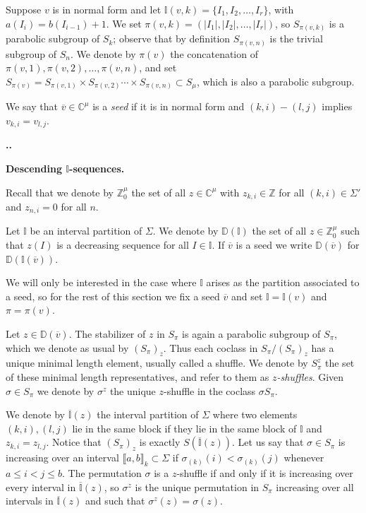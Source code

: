 \documentclass[11pt,fleqn]{amsart}
\renewcommand\thesection{\arabic{section}}
\newcounter{para}[section]
\renewcommand\thepara{\thesection.\arabic{para}}
\def\paragraph{%
 \noindent
 \refstepcounter{para}%
 \textbf{\thepara.}\hspace{1ex}%
}
\newcommand\about[1]{%
 {\bfseries#1.}%
}
\newcommand\CC{\mathbb C}
\newcommand\ZZ{\mathbb Z}
\newcommand\vv{\overline{v}}
\newcommand\II{\mathbb I}
\newcommand\RI{\overline{\mathbb I}}
\newcommand\interval[1]{\llbracket #1 \rrbracket}
\newcommand\abs[1]{|#1|}
\newcommand\DD{\mathbb D}
\begin{document}
Suppose $v$ is in normal form and let $\II(v,k) = \{I_1, I_2, \ldots, I_r\}$, 
with $a(I_i) = b(I_{i-1}) + 1$. We set $\pi(v,k) = (\abs{I_1},\abs{I_2}, 
\ldots, \abs{I_r})$, so $S_{\pi(v,k)}$ is a parabolic subgroup of $S_k$; 
observe that by definition $S_{\pi(v,n)}$ is the trivial subgroup of $S_n$. 
We denote by $\pi(v)$ the concatenation of $\pi(v,1), \pi(v,2), \ldots,
\pi(v,n)$, and set $S_{\pi(v)} = S_{\pi(v,1)} \times S_{\pi(v,2)} \cdots 
\times S_{\pi(v,n)} \subset S_\mu$, which is also a parabolic subgroup.
\begin{Definition}
We say that $\vv \in \CC^\mu$ is a \emph{seed} if it is in normal form and 
$(k,i) - (l,j)$ implies $v_{k,i} = v_{l,j}$.
\end{Definition}

\paragraph
\label{descending-z}
\about{Descending $\II$-sequences}
Recall that we denote by $\ZZ^\mu_0$ the set of all $z \in \CC^\mu$ with
$z_{k,i} \in \ZZ$ for all $(k,i) \in \Sigma'$ and $z_{n,i} = 0$ for all $n$.
\begin{Definition}
Let $\II$ be an interval partition of $\Sigma$. We denote by $\DD(\II)$ the 
set of all $z \in \ZZ^\mu_0$ such that $z(I)$ is a decreasing sequence for all 
$I \in \II$. If $\vv$ is a seed we write $\DD(\vv)$ for $\DD(\II(\vv))$.
\end{Definition}
We will only be interested in the case where $\II$ arises as the partition 
associated to a seed, so for the rest of this section we fix a seed $\vv$ and
set $\II = \II(v)$ and $\pi = \pi(v)$.

Let $z \in \DD(\vv)$. The stabilizer of $z$ in $S_\pi$ is again a parabolic 
subgroup of $S_\pi$, which we denote as usual by $(S_\pi)_z$. Thus each 
coclass in $S_\pi/(S_\pi)_z$ has a unique minimal length element, usually 
called a shuffle. We denote by $S_\pi^z$ the set of these minimal length 
representatives, and refer to them as \emph{$z$-shuffles}. Given $\sigma \in
S_\pi$ we denote by $\sigma^z$ the unique $z$-shuffle in the coclass 
$\sigma S_\pi$.

We denote by $\RI(z)$ the interval partition of $\Sigma$ where two elements 
$(k,i), (l,j)$ lie in the same block if they lie in the same block of $\II$ 
and $z_{k,i} = z_{l,j}$. Notice that $(S_\pi)_z$ is exactly $S(\RI(z))$. Let 
us say that $\sigma \in S_\pi$ is increasing over an interval 
$\interval{a,b}_k \subset \Sigma$ if $\sigma_{(k)}(i) < \sigma_{(k)}(j)$ 
whenever $a \leq i < j \leq b$. The permutation $\sigma$ is a $z$-shuffle if 
and only if it is increasing over every interval in $\RI(z)$, so $\sigma^z$
is the unique permutation in $S_\pi$ increasing over all intervals in $\RI(z)$
and such that $\sigma^z(z) = \sigma(z)$.
\end{document}

